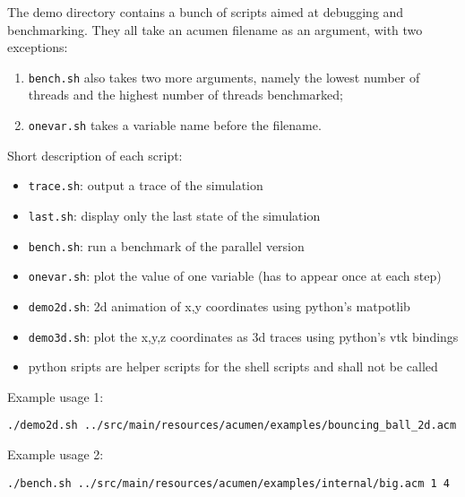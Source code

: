 The demo directory contains a bunch of scripts aimed at debugging and benchmarking. They all take an acumen filename as an argument, with two exceptions:

\begin{enumerate}
   \item \lstinline{bench.sh} also takes two more arguments, namely the lowest number of threads and the highest number of threads benchmarked;
   \item \lstinline{onevar.sh} takes a variable name before the filename. 
\end{enumerate}

Short description of each script:

\begin{itemize}
    \item \lstinline{trace.sh}:  output a trace of the simulation
    \item \lstinline{last.sh}:  display only the last state of the simulation
    \item \lstinline{bench.sh}:  run a benchmark of the parallel version
    \item \lstinline{onevar.sh}:  plot the value of one variable (has to appear once at each step)
    \item \lstinline{demo2d.sh}:  2d animation of x,y coordinates using python's matpotlib
    \item \lstinline{demo3d.sh}:  plot the x,y,z coordinates as 3d traces using python's vtk bindings
    \item python sripts are helper scripts for the shell scripts and shall not be called 
\end{itemize}

Example usage 1:

\begin{lstlisting}
./demo2d.sh ../src/main/resources/acumen/examples/bouncing_ball_2d.acm
\end{lstlisting}

Example usage 2:

\begin{lstlisting}
./bench.sh ../src/main/resources/acumen/examples/internal/big.acm 1 4
\end{lstlisting}
